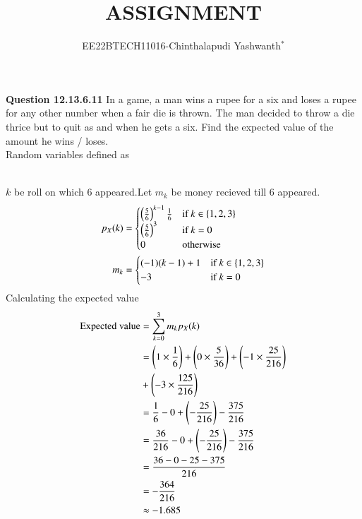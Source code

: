 \documentclass[journal,12pt,twocolumn]{IEEEtran}
\theoremstyle{remark}
\begin{document}

\vspace{3cm}

\title{ASSIGNMENT}
\author{EE22BTECH11016-Chinthalapudi Yashwanth$^{*}$%
}
\maketitle
\newpage
\bigskip
\renewcommand{\thefigure}{\theenumi}
\renewcommand{\thetable}{\theenumi}

\textbf{Question 12.13.6.11}
In a game, a man wins a rupee for a six and loses a rupee for any other number
when a fair die is thrown. The man decided to throw a die thrice but to quit as
and when he gets a six. Find the expected value of the amount he wins / loses.\\
\solution
Random variables defined as
\begin{table}[!ht]
	
\end{table}\\
$k$ be roll on which 6 appeared.Let $m_k$ be money recieved till 6 appeared.
\begin{align}
p_{X}(k)&=\begin{cases}
            \left(\frac{5}{6}\right)^{k-1} \frac{1}{6} & \text{if } k \in \{1,2,3\}\\
            \left(\frac{5}{6}\right)^{3} & \text{if } k =0 \\
            0 & \text{otherwise}
        \end{cases}\\
m_k &=\begin{cases}
            (-1)(k-1)+1 & \text{if } k \in \{1,2,3\}\\
            -3 & \text{if } k =0 
        \end{cases}
\end{align}
Calculating the expected value
\begin{align}
\text{Expected value} & = \sum^{3}_{k=0} m_k p_{X}(k)\\
&=\left(1 \times \frac{1}{6}\right) + \left(0 \times \frac{5}{36}\right) + \left(-1 \times \frac{25}{216}\right)\notag \\
    &+ \left(-3 \times \frac{125}{216}\right) \\
    &= \frac{1}{6} - 0 + \left(-\frac{25}{216}\right)- \frac{375}{216} \\
    &= \frac{36}{216} - 0 + \left(-\frac{25}{216}\right) - \frac{375}{216} \\
    &= \frac{36 - 0 - 25 - 375}{216} \\
    &= -\frac{364}{216} \\
    &\approx -1.685
\end{align}
\end{document}
